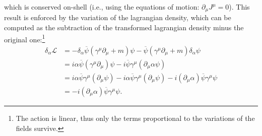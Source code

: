which is conserved on-shell (i.e., using the equations of motion: \(\partial_{\mu}J^{\mu}=0\)). This result is enforced by the variation of the lagrangian density, which can be computed as the subtraction of the transformed lagrangian density minus the original one:\footnote{The action is linear, thus only the terms proportional to the variations of the fields survive.}
\[
    \begin{aligned}
        \delta_{\alpha} \mathcal{L} & = - \delta_{\alpha} \overline{\psi} (\gamma^{\mu} \partial_\mu + m) \psi - \overline{\psi} (\gamma^{\mu} \partial_\mu + m) \delta_{\alpha} \psi                                     \\
                                    & = i \alpha \overline{\psi} (\gamma^{\mu} \partial_\mu) \psi - i \overline{\psi} \gamma^{\mu} (\partial_\mu \alpha \psi)                                                             \\
                                    & = i \alpha \overline{\psi} \gamma^{\mu} (\partial_\mu \psi) - i \alpha \overline{\psi} \gamma^{\mu} (\partial_\mu \psi) - i (\partial_\mu \alpha) \overline{\psi} \gamma^{\mu} \psi \\
                                    & = - i (\partial_\mu \alpha) \overline{\psi} \gamma^{\mu} \psi.
    \end{aligned}
\]

